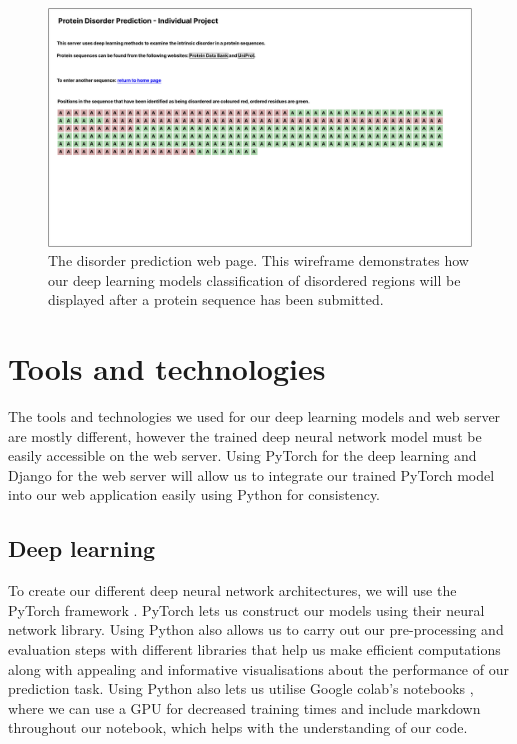 \documentclass{l4proj}
\begin{document}
\begin{figure}[!ht]
    \centering
    \includegraphics[width=\linewidth]{dissertation/images/Index - disorder prediction.pdf}
    
    \caption{The disorder prediction web page. This wireframe demonstrates how our deep learning models classification of disordered regions will be displayed after a protein sequence has been submitted.}
    
    \label{fig:wireframe2} 
\end{figure}

\section{Tools and technologies}

The tools and technologies we used for our deep learning models and web server are mostly different, however the trained deep neural network model must be easily accessible on the web server. Using PyTorch for the deep learning and Django for the web server will allow us to integrate our trained PyTorch model into our web application easily using Python for consistency.

\subsection{Deep learning}

To create our different deep neural network architectures, we will use the PyTorch framework \citep{pytorch}. PyTorch lets us construct our models using their neural network library. Using Python also allows us to carry out our pre-processing and evaluation steps with different libraries that help us make efficient computations along with appealing and informative visualisations about the performance of our prediction task. Using Python also lets us utilise Google colab’s notebooks \citep{Bisong:19}, where we can use a GPU for decreased training times and include markdown throughout our notebook, which helps with the understanding of our code.
\end{document}
